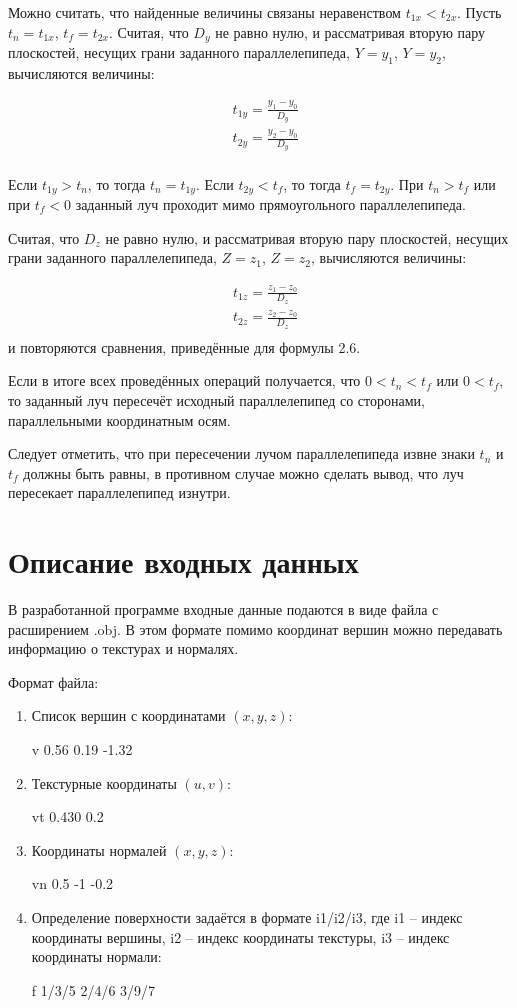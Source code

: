 Можно считать, что найденные величины связаны неравенством $ t_{1x} < t_{2x} $.
Пусть $t_n = t_{1x}$, $t_f = t_{2x}$. Считая, что $D_y$ не равно нулю, и рассматривая вторую пару плоскостей, несущих грани заданного параллелепипеда, $Y = y_1$, $Y = y_2$, вычисляются величины:

\begin{equation}
\begin{aligned}
& t_{1y} = \frac{y_1 - y_0}{D_y} \\ 
& t_{2y} = \frac{y_2 - y_0}{D_y} \\
\end{aligned}
\end{equation} 

Если $t_{1y} > t_n$, то тогда $t_n = t_{1y}$.
Если $t_{2y} < t_f$, то тогда $t_f = t_{2y}$.
При $t_n > t_f$ или при $t_f < 0$ заданный луч проходит мимо прямоугольного параллелепипеда.

Считая, что $D_z$ не равно нулю, и рассматривая вторую пару плоскостей, несущих грани заданного параллелепипеда, $Z = z_1$, $Z = z_2$, вычисляются величины:

\begin{equation}
\begin{aligned}
& t_{1z} = \frac{z_1 - z_0}{D_z} \\ 
& t_{2z} = \frac{z_2 - z_0}{D_z} \\
\end{aligned}
\end{equation} 
и повторяются сравнения, приведённые для формулы 2.6.

Если в итоге всех проведённых операций получается, что $0 < t_n < t_f$ или $ 0 < t_f$, то заданный луч пересечёт исходный параллелепипед со сторонами, параллельными координатным осям.

Следует отметить, что при пересечении лучом параллелепипеда извне знаки $t_n$ и  $t_f$ должны быть равны, в противном случае можно сделать вывод, что луч пересекает параллелепипед изнутри.

\section{Описание входных данных}
В разработанной программе входные данные подаются в виде файла с расширением .obj. В этом формате помимо координат вершин можно передавать информацию о текстурах и нормалях.

Формат файла:
\begin{enumerate}
	\item Список вершин с координатами $(x, y, z)$:
		
		v 0.56 0.19 -1.32
	\item Текстурные координаты $(u, v)$:
		
		vt 0.430 0.2
	\item Координаты нормалей $(x, y, z)$:
		
		vn 0.5 -1 -0.2
	\item Определение поверхности задаётся в формате i1/i2/i3, где i1 -- индекс координаты вершины, i2 -- индекс координаты текстуры, i3 -- индекс координаты нормали:
		
		f 1/3/5 2/4/6 3/9/7
\end{enumerate}

